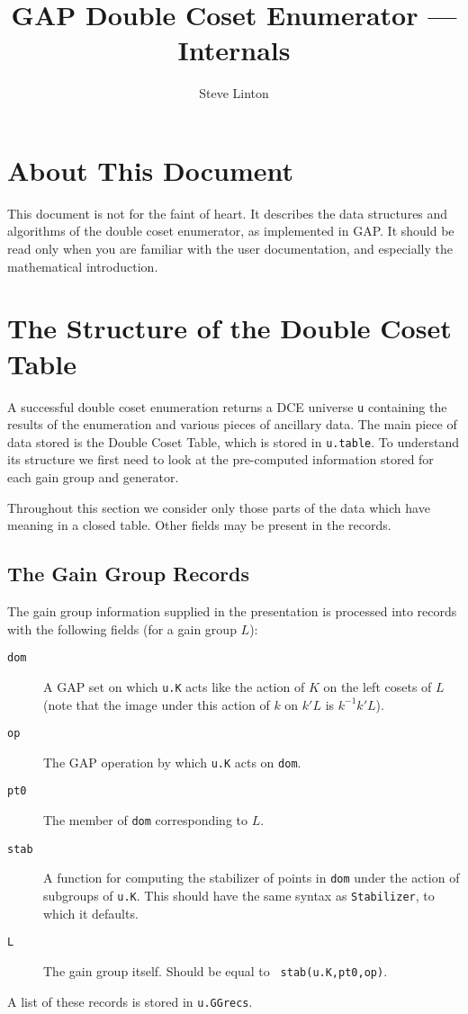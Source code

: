 \def\Stab{\mathord{\mbox{Stab}}}
\def\gen<#1>{\left\langle\,#1\,\right\rangle}
\def\genr<#1|#2>{\left\langle\,#1\mid#2\,\right\rangle}
\let\iso=\cong
\def\split{\mathop{:}}
\title{GAP Double Coset Enumerator --- Internals}
\author{Steve Linton}

\maketitle
\section{About This Document}
This document is not for the faint of heart. It describes the data
structures and algorithms  of the double coset enumerator, as
implemented in GAP. It should be read only when you are familiar with
the user documentation, and especially the mathematical introduction.

\section{The Structure of the Double Coset Table}
A successful double coset enumeration returns a DCE universe {\tt u}
containing the results of the enumeration and various pieces of
ancillary data. The main piece of data stored is the Double Coset
Table, which is stored in {\tt u.table}. 
To understand its structure we first need to look at the pre-computed
information stored for each gain group and generator.

Throughout this section we consider only those parts of the data which
have meaning in a closed table. Other fields may be present in the
records.
\subsection{The Gain Group Records}
The gain group information supplied in the presentation is processed
into records with the following fields (for a gain group $L$):
\begin{description}
\item[\tt dom] A GAP set on which {\tt u.K} acts like the action
of $K$ on the left cosets of $L$ (note that the image under this action of
$k$ on $k'L$ is $k^{-1}k'L$).
\item[\tt op] The GAP operation by which {\tt u.K} acts on {\tt dom}.
\item[\tt pt0] The member of {\tt dom} corresponding to $L$.
\item[\tt stab] A function for computing the stabilizer of points in
{\tt dom} under the action of subgroups of {\tt u.K}. This should have
the same syntax as {\tt Stabilizer}, to which it defaults.
\item[\tt L] The gain group itself. Should be equal to {\tt
stab(u.K,pt0,op)}.
\end{description}
A list of these records is stored in {\tt u.GGrecs}.
